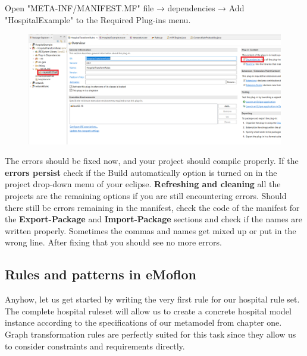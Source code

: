 Open \textsf{"META-INF/MANIFEST.MF"} file → \textsf{dependencies} → Add \textsf{"HospitalExample"} to the Required Plug-ins menu.\newline\newline

\begin{figure}[h]
    \centering
    \includegraphics[scale=0.7, width= \textwidth]{pictures/manifest.png}
    \caption{}
    \label{manifest}
\end{figure}

\raggedright

The errors should be fixed now, and your project should compile properly. If the \textbf{errors persist} check if the Build automatically option is turned on in the project drop-down menu of your eclipse. \textbf{Refreshing and cleaning} all the projects are the remaining options if you are still encountering errors. Should there still be errors remaining in the manifest, check the code of the manifest for the \textbf{Export-Package} and \textbf{Import-Package} sections and check if the names are written properly. Sometimes the commas and names get mixed up or put in the wrong line. After fixing that you should see no more errors.

\raggedright

\clearpage
\subsection{Rules and patterns in eMoflon}

Anyhow, let us get started by writing the very first rule for our hospital rule set. The complete hospital ruleset will allow us to create a concrete hospital model instance according to the specifications of our metamodel from chapter one. Graph transformation rules are perfectly suited for this task since they allow us to consider constraints and requirements directly.\newline


